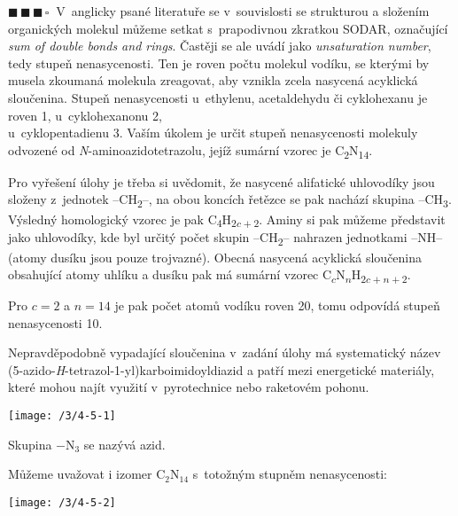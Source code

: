 \documentclass{book}
\newcommand{\tri}{$\blacksquare \, \blacksquare \, \blacksquare \, \square \; \; $}
\renewenvironment{quotation}{\par}{\par} %
\begin{document}
\hrulefill %
\begin{quotation}
\tri V~anglicky psané literatuře se v~souvislosti se strukturou a složením
organických molekul můžeme setkat s~prapodivnou zkratkou SODAR, označující
\textit{sum of double bonds and rings}. Častěji se ale uvádí jako
\textit{unsaturation number}, tedy stupeň nenasycenosti. Ten je roven
počtu molekul vodíku, se kterými by musela zkoumaná molekula zreagovat,
aby vznikla zcela nasycená acyklická sloučenina.
Stupeň nenasycenosti u~ethylenu, acetaldehydu či cyklohexanu je roven
1, u~cyklohexanonu 2,\\u~cyklopentadienu 3. Vaším úkolem je určit
stupeň nenasycenosti molekuly odvozené od \textit{N}-aminoazido\-tetrazolu,
jejíž sumární vzorec je C\textsubscript{2}N\textsubscript{14}.
\end{quotation} \dotfill \par 
Pro vyřešení úlohy je třeba si uvědomit, že nasycené alifatické uhlovodíky
jsou složeny z~jednotek --CH\textsubscript{2}--, na obou koncích řetězce
se pak nachází skupina --CH\textsubscript{3}. Výsledný homologický
vzorec je pak C\textsubscript{$4$}H\textsubscript{$2c+2$}. Aminy si
pak můžeme představit jako uhlovodíky, kde byl určitý počet skupin
--CH\textsubscript{2}-- nahrazen jednotkami --NH-- (atomy dusíku jsou
pouze trojvazné). Obecná nasycená acyklická sloučenina obsahující
atomy uhlíku a dusíku pak má sumární vzorec C\textsubscript{$c$}N\textsubscript{$n$}H\textsubscript{$2c+n+2$}.

Pro $c=2$ a $n=14$ je pak počet atomů vodíku roven 20, tomu odpovídá stupeň
nenasycenosti 10.

Nepravděpodobně vypadající sloučenina v~zadání
úlohy má systematický název (5-azido-\textit{H}-tetrazol-1-yl)\-karboimidoyldiazid
a patří mezi energetické materiály, které mohou najít využití
v~pyrotechnice nebo raketovém pohonu. 
\noindent \begin{center}

\texttt{[image: /3/4-5-1]}

\par\end{center}

Skupina $\mathrm{-N_{3}}$ se nazývá azid.

Můžeme uvažovat i izomer $\mathrm{C_{2}N_{14}}$ s~totožným stupněm
nenasycenosti:
\noindent \begin{center}

\texttt{[image: /3/4-5-2]}

\par\end{center}
\end{document}
